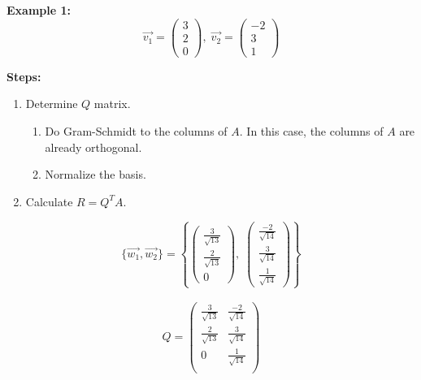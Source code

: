 \noindent
\newline
\textbf{Example 1: }
\begin{equation}
    \Vec{v_1} = \begin{pmatrix}
        3 \\ 2 \\ 0
    \end{pmatrix}, \; \Vec{v_2} = \begin{pmatrix}
        -2 \\ 3 \\ 1
    \end{pmatrix}
\end{equation}

\noindent
\textbf{Steps:}
\begin{enumerate}
    \item Determine \(Q\) matrix.
    \begin{enumerate}
        \item Do Gram-Schmidt to the columns of \(A\). In this case, the columns of \(A\) are already orthogonal.
        \item Normalize the basis.
    \end{enumerate}
    \item Calculate \(R = Q^T A\).
\end{enumerate}

\begin{equation}
    \{\Vec{w_1}, \Vec{w_2}\} = \left\{ \begin{pmatrix}
        \frac{3}{\sqrt{13}} \\ \frac{2}{\sqrt{13}} \\ 0
    \end{pmatrix}, \; \begin{pmatrix}
        \frac{-2}{\sqrt{14}} \\ \frac{3}{\sqrt{14}} \\ \frac{1}{\sqrt{14}}
    \end{pmatrix} \right\}
\end{equation}

\begin{align}
    Q = \begin{pmatrix}
        \frac{3}{\sqrt{13}} & \frac{-2}{\sqrt{14}} \\
        \frac{2}{\sqrt{13}} & \frac{3}{\sqrt{14}} \\
        0 & \frac{1}{\sqrt{14}} \\
    \end{pmatrix}
\end{align}


